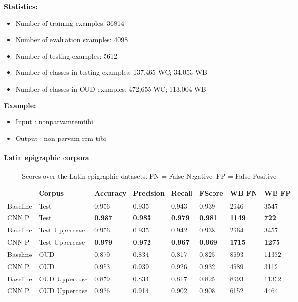 \documentclass{jdmdh}
\begin{document}
\textbf{Statistics:}

\begin{itemize}
\item Number of training examples: 36814
\item Number of evaluation examples: 4098
\item Number of testing examples: 5612
\item Number of classes in testing examples: 137,465 WC; 34,053 WB
\item Number of classes in OUD examples: 472,655 WC; 113,004 WB
\end{itemize}

\textbf{Example:}

\begin{itemize}
    \item Input : nonparvamremtibi  
    \item Output : non parvam rem tibi

\end{itemize}

\paragraph{Latin epigraphic corpora}

\begin{table}[H]
\centering
\begin{tabular}{llllllll}
\hline
 & Corpus & Accuracy & Precision & Recall & FScore & WB FN & WB FP \\ \hline
Baseline & Test & 0.956 & 0.935 & 0.943 & 0.939 & 2646 & 3547 \\
CNN P & Test & \textbf{0.987} & \textbf{0.983} & \textbf{0.979} & \textbf{0.981} & \textbf{1149} & \textbf{722} \\ \hline
Baseline & Test Uppercase & 0.956 & 0.935 & 0.942 & 0.938 & 2664 & 3457 \\
CNN P & Test Uppercase & \textbf{0.979} & \textbf{0.972} & \textbf{0.967} & \textbf{0.969} & \textbf{1715} & \textbf{1275} \\ \hline
Baseline & OUD & 0.879 & 0.834 & 0.817 & 0.825 & 8693 & 11332 \\
CNN P & OUD & 0.953 & 0.939 & 0.926 & 0.932 & 4689 & 3112 \\ \hline
Baseline & OUD Uppercase & 0.879 & 0.834 & 0.817 & 0.825 & 8693 & 11332 \\
CNN P & OUD Uppercase & 0.936 & 0.914 & 0.902 & 0.908 & 6152 & 4464 \\ \hline
\end{tabular}
\caption{Scores over the Latin epigraphic datasets. FN = False Negative, FP = False Positive}
\label{tab:epigraphyc_latin}
\end{table}
\end{document}
